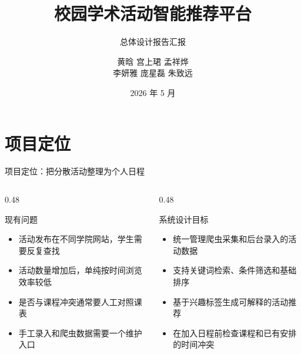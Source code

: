 \documentclass[UTF8,aspectratio=169]{ctexbeamer}
\title[总体设计报告展示]{校园学术活动智能推荐平台}
\subtitle{总体设计报告汇报}
\author[SE 第 4 组]{黄晗 \quad 宫上珺 \quad 孟祥烨 \\ 李妍雅 \quad 庞星磊 \quad 朱致远}
\institute[浙江大学]{}
\date[2026-05]{2026 年 5 月}
\begin{document}
\begin{frame}
    \titlepage
\end{frame}

\section{项目定位}
\begin{frame}{项目定位：把分散活动整理为个人日程}
    \begin{columns}[T,onlytextwidth]
        \begin{column}{0.48\textwidth}
            \begin{block}{现有问题}
                \begin{itemize}
                    \item 活动发布在不同学院网站，学生需要反复查找
                    \item 活动数量增加后，单纯按时间浏览效率较低
                    \item 是否与课程冲突通常要人工对照课表
                    \item 手工录入和爬虫数据需要一个维护入口
                \end{itemize}
            \end{block}
        \end{column}
        \begin{column}{0.48\textwidth}
            \begin{block}{系统设计目标}
                \begin{itemize}
                    \item 统一管理爬虫采集和后台录入的活动数据
                    \item 支持关键词检索、条件筛选和基础排序
                    \item 基于兴趣标签生成可解释的活动推荐
                    \item 在加入日程前检查课程和已有安排的时间冲突
                \end{itemize}
            \end{block}
        \end{column}
    \end{columns}
\end{frame}
\end{document}
